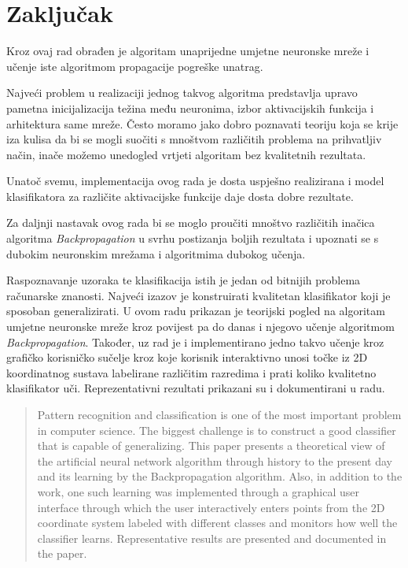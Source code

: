 \documentclass[times, utf8, zavrsni]{fer}
\begin{document}
\chapter{Zaključak}
Kroz ovaj rad obrađen je algoritam unaprijedne umjetne neuronske mreže i učenje iste algoritmom propagacije pogreške unatrag.

Najveći problem u realizaciji jednog takvog algoritma predstavlja upravo pametna inicijalizacija težina među neuronima, izbor aktivacijskih funkcija i arhitektura same mreže. Često moramo jako dobro poznavati teoriju koja se krije iza kulisa da bi se mogli suočiti s mnoštvom različitih problema na prihvatljiv način, inače možemo unedogled vrtjeti algoritam bez kvalitetnih rezultata.

Unatoč svemu, implementacija ovog rada je dosta uspješno realizirana i model klasifikatora za različite aktivacijske funkcije daje dosta dobre rezultate.

\bigskip
Za daljnji nastavak ovog rada bi se moglo proučiti mnoštvo različitih inačica algoritma \textit{Backpropagation} u svrhu postizanja boljih rezultata i upoznati se s dubokim neuronskim mrežama i algoritmima dubokog učenja.




\begin{sazetak}
Raspoznavanje uzoraka te klasifikacija istih je jedan od bitnijih problema računarske znanosti. Najveći izazov je konstruirati kvalitetan klasifikator koji je sposoban generalizirati. U ovom radu prikazan je teorijski pogled na algoritam umjetne neuronske mreže kroz povijest pa do danas i njegovo učenje algoritmom \textit{Backpropagation}. Također, uz rad je i implementirano jedno takvo učenje kroz grafičko korisničko sučelje kroz koje korisnik interaktivno unosi točke iz 2D koordinatnog sustava labelirane različitim razredima i prati koliko kvalitetno klasifikator uči. Reprezentativni rezultati prikazani su i dokumentirani u radu.

\end{sazetak}

\begin{abstract}
Pattern recognition and classification is one of the most important problem in computer science. The biggest challenge is to construct a good classifier that is capable of generalizing. This paper presents a theoretical view of the artificial neural network algorithm through history to the present day and its learning by the Backpropagation algorithm. Also, in addition to the work, one such learning was implemented through a graphical user interface through which the user interactively enters points from the 2D coordinate system labeled with different classes and monitors how well the classifier learns. Representative results are presented and documented in the paper.

\end{abstract}
\end{document}
